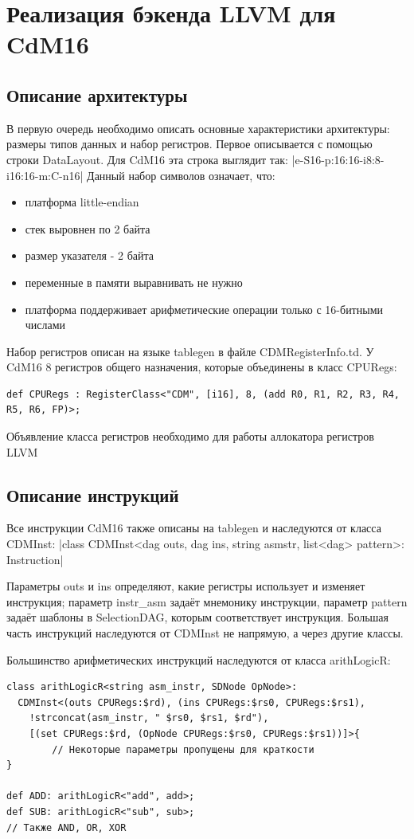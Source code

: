 \documentclass[a4paper,14pt]{extarticle}
\begin{document}
\pagebreak
\section{Реализация бэкенда LLVM для CdM16}
\subsection{Описание архитектуры}
В первую очередь необходимо описать основные характеристики архитектуры: размеры типов данных и набор регистров. Первое описывается с помощью строки DataLayout. Для CdM16 эта строка выглядит так: |e-S16-p:16:16-i8:8-i16:16-m:C-n16|
Данный набор символов означает, что:
\begin{itemize}
	\item платформа little-endian
	\item стек выровнен по 2 байта
	\item размер указателя - 2 байта
	\item переменные в памяти выравнивать не нужно
	\item платформа поддерживает арифметические операции только с 16-битными числами
\end{itemize}

Набор регистров описан на языке tablegen в файле CDMRegisterInfo.td. У CdM16 8 регистров общего назначения, которые объединены в класс CPURegs:
\begin{verbatim}
def CPURegs : RegisterClass<"CDM", [i16], 8, (add R0, R1, R2, R3, R4, R5, R6, FP)>;
\end{verbatim}
Объявление класса регистров необходимо для работы аллокатора регистров LLVM

\subsection{Описание инструкций}
Все инструкции CdM16 также описаны на tablegen и наследуются от класса CDMInst:
|class CDMInst<dag outs, dag ins, string asmstr, list<dag> pattern>: Instruction|

Параметры outs и ins определяют, какие регистры использует и изменяет инструкция; параметр instr\_asm задаёт мнемонику инструкции, параметр pattern задаёт шаблоны в SelectionDAG, которым соответствует инструкция. Большая часть инструкций наследуются от CDMInst не напрямую, а через другие классы.

Большинство арифметических инструкций наследуются от класса arithLogicR:
\begin{verbatim}
class arithLogicR<string asm_instr, SDNode OpNode>:
  CDMInst<(outs CPURegs:$rd), (ins CPURegs:$rs0, CPURegs:$rs1),
    !strconcat(asm_instr, " $rs0, $rs1, $rd"),
    [(set CPURegs:$rd, (OpNode CPURegs:$rs0, CPURegs:$rs1))]>{
		// Некоторые параметры пропущены для краткости
}

def ADD: arithLogicR<"add", add>;
def SUB: arithLogicR<"sub", sub>;
// Также AND, OR, XOR
\end{verbatim}
\end{document}
